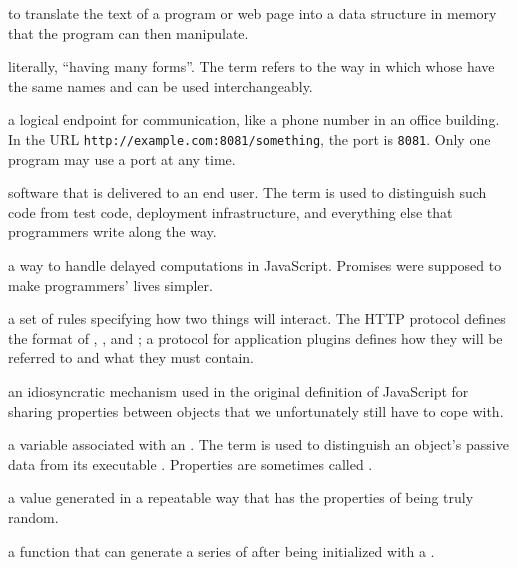 \begin{description}
to translate the text of a program or web page into a data structure in memory
that the program can then manipulate.

literally, ``having many forms''. The term refers to the way in which
 whose  have the same names and
 can be used interchangeably.

a logical endpoint for communication, like a phone number in an office
building. In the URL \texttt{http://example.com:8081/something}, the port is \texttt{8081}.
Only one program may use a port at any time.

software that is delivered to an end user. The term is used to distinguish
such code from test code, deployment infrastructure, and everything else that
programmers write along the way.

a way to handle delayed computations in JavaScript. Promises were supposed to
make programmers' lives simpler.

a set of rules specifying how two things will interact. The HTTP protocol
defines the format of ,
, and ; a
protocol for application plugins defines how they will be referred to and what
 they must contain.

an idiosyncratic mechanism used in the original definition of JavaScript for
sharing properties between objects that we unfortunately still have to cope
with.

a variable associated with an . The term is used to
distinguish an object's passive data from its executable .
Properties are sometimes called .

a value generated in a repeatable way that has the properties of being truly
random.

a function that can generate a series of  after being initialized with a
.


\end{description}
